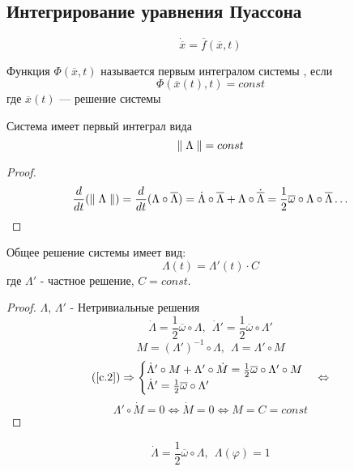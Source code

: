   \subsection{Интегрирование уравнения Пуассона}
  \begin{equation} 
  \label{upper_system}
  \dot{\overline x} = \overline f(\overline x, t)
  \end{equation}
  \begin{df}
  Функция $\Phi(\overline x, t)$ называется первым интегралом системы , если
  \[ \Phi(\overline x(t), t) = const \]
  где $\overline x(t)$ --- решение системы 
  \end{df}
  \begin{ass}
  Система  имеет первый интеграл вида
  \[{\parallel \Lambda \parallel} = const \]
  \end{ass}
  \begin{proof}
  \[ \frac{d}{dt}({\parallel \Lambda \parallel}) = \frac{d}{dt}(\Lambda \circ \overline \Lambda) = \dot \Lambda \circ \overline \Lambda + \Lambda \circ \dot{\overline \Lambda} = \frac{1}{2} \overline \omega \circ \Lambda \circ \overline \Lambda \ldots \]
  \end{proof}
  \begin{ass}
  Общее решение системы  имеет вид:
  \[ \Lambda(t) = \Lambda'(t) \cdot C\]
  где $\Lambda'$ - частное решение, $C = const$.
  \end{ass}
  \begin{proof}
  $\Lambda$, $\Lambda'$ - Нетривиальные решения 
  \[ \dot \Lambda = \frac{1}{2}\overline \omega \circ \Lambda,~~ \dot{\Lambda}' = \frac{1}{2}\overline \omega \circ \Lambda'\]
  \[ M = (\Lambda')^{-1} \circ \Lambda,~~ \Lambda = \Lambda' \circ M \]
  \[ \re{c.2} \Rightarrow \begin{cases}
  \dot \Lambda' \circ M + \Lambda' \circ \dot M = \frac{1}{2} \overline \omega \circ \Lambda' \circ M \\
  \dot \Lambda' = \frac{1}{2}\overline \omega \circ \Lambda'
  \end{cases}  \Leftrightarrow \]
  \[ \Lambda' \circ \dot M = 0 \Leftrightarrow \dot M = 0 \Leftrightarrow M = C = const \]
  \end{proof}
  \begin{cor}
  \begin{equation}
  \label{c.3} 
  \dot \Lambda = \frac{1}{2} \overline \omega \circ \Lambda,~~ \Lambda(\varphi) = 1 
  \end{equation}
  \end{cor}

